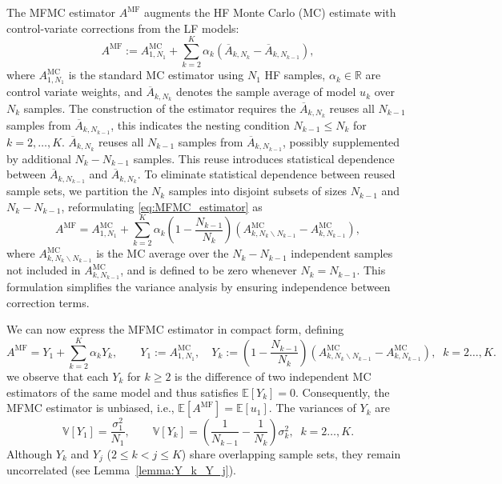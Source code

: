 The MFMC estimator $A^{\text{MF}}$ augments the HF Monte Carlo (MC) estimate with control-variate corrections from the LF models:
%
\begin{equation}\label{eq:MFMC_estimator}
    A^{\text{MF}} := A^{\text{MC}}_{1,N_1} + \sum_{k=2}^K \alpha_k\left(\overline{A}_{k,N_k} - \overline{A}_{k,N_{k-1}}\right),
\end{equation}
%
where $A^{\text{MC}}_{1,N_1}$ is the standard MC estimator using $N_1$ HF samples, $\alpha_k \in \mathbb{R}$ are control variate weights, and $\overline{A}_{k,N_k}$ denotes the sample average of model $u_{k}$ over $N_k$ samples. The construction of the estimator requires the $\overline{A}_{k,N_{k}}$ reuses all $N_{k-1}$ samples from $\overline{A}_{k,N_{k-1}}$, this indicates the nesting condition $N_{k-1}\le N_k$ for $k=2,\ldots, K$. $\overline{A}_{k,N_{k}}$ reuses all $N_{k-1}$ samples from $\overline{A}_{k,N_{k-1}}$, possibly supplemented by additional $N_{k} - N_{k-1}$ samples. This reuse introduces statistical dependence between $\overline{A}_{k,N_{k-1}}$ and $\overline{A}_{k,N_{k}}$. To eliminate statistical dependence between reused sample sets, we partition the $N_k$ samples into disjoint subsets of sizes $N_{k-1}$ and $N_k-N_{k-1}$, reformulating \eqref{eq:MFMC_estimator} as
%
\begin{equation}\label{eq:MFMC_estimator_independent}
    A^{\text{MF}} = A^{\text{MC}}_{1,N_1} +  \sum_{k=2}^K \alpha_k\!\left(1-\frac{N_{k-1}}{N_k}\right)\left(A^{\text{MC}}_{k,N_k\backslash N_{k-1}}-A^{\text{MC}}_{k,N_{k-1}}\right),
\end{equation}
%
where $A^{\text{MC}}_{k,N_k\backslash N_{k-1}}$ is the MC average over the $N_k-N_{k-1}$ independent samples not included in $A^{\text{MC}}_{k,N_{k-1}}$, and is defined to be zero whenever $N_k=N_{k-1}$. This formulation simplifies the variance analysis by ensuring independence between correction terms.

 We can now express the MFMC estimator in compact form, defining
\begin{equation}\label{eq:MFMC_Yk}
A^{\text{MF}} = Y_1 + \sum_{k=2}^K \alpha_k Y_k, \qquad 
Y_1 := A^{\text{MC}}_{1,N_1},\quad 
Y_k := \left(1-\frac{N_{k-1}}{N_k}\right)\!\left(A^{\text{MC}}_{k,N_k\backslash N_{k-1}} - A^{\text{MC}}_{k,N_{k-1}}\right), \;\; k=2\ldots, K.
\end{equation}
%
we observe that each $Y_k$ for $k\ge2$ is the difference of two independent MC estimators of the same model and thus satisfies $\mathbb{E}[Y_k]=0$. Consequently, the MFMC estimator is unbiased, i.e., $\mathbb{E}[A^{\text{MF}}]=\mathbb{E}[u_{1}]$. The variances of $Y_k$ are
%
\begin{equation}\label{eq:Var_Yk}
    \mathbb{V}[Y_1] = \frac{\sigma_1^2}{N_1}, \qquad 
    \mathbb{V}[Y_k] = \left(\frac{1}{N_{k-1}} - \frac{1}{N_k}\right)\sigma_k^2, \;\; k=2\ldots, K.
\end{equation}
%
Although $Y_k$ and $Y_j$ ($2\le k<j\le K$) share overlapping sample sets, they remain uncorrelated (see Lemma~\ref{lemma:Y_k_Y_j}). 


